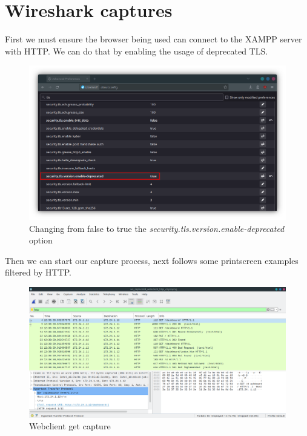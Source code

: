 \documentclass[11pt,a4paper]{report}
\begin{document}
    \section{Wireshark captures}
        \begin{flushleft}
            First we must ensure the browser being used can connect to the XAMPP server with HTTP. We can do that by enabling the usage of deprecated TLS.
            \clearpage
            \begin{figure}[h]
                \centering
                \includegraphics[scale=0.4]{librewolf_tls} 
                \caption{Changing from false to true the \textit{security.tls.version.enable-deprecated} option}
                \label{fig:librewolf}
            \end{figure}

            Then we can start our capture process, next follows some printscreen examples filtered by HTTP.
            \begin{flushleft}
                \begin{figure}[h]
                    \centering
                    \includegraphics[scale=0.43]{wscapwcsocket05} %
                    \caption{Webclient get capture} \label{fig:wireshark1}
                \end{figure}
                

\end{flushleft}
\end{flushleft}
\end{document}
